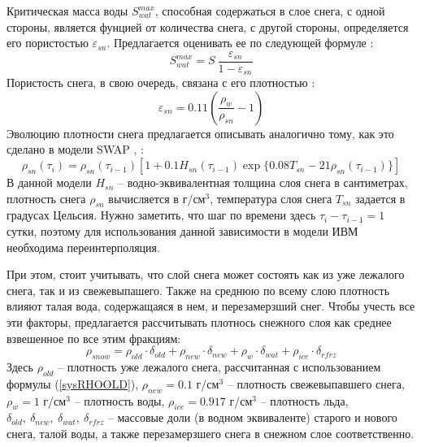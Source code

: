 \documentclass[a4paper, fontsize=14pt]{scrartcl}
\begin{document}
Критическая масса воды $S_{wat}^{max}$, способная содержаться в слое снега, с одной стороны, является фунцией от количества снега, с другой стороны, определяется его пористостью $\varepsilon_{sn}$. Предлагается оценивать ее по следующей формуле \cite{Gusev2002}:
\begin{equation}
     S_{wat}^{max} = S ~\dfrac{\varepsilon_{sn}}{1 - \varepsilon_{sn}}  \label{sys}  
\end{equation}
Пористость снега, в свою очередь, связана с его плотностью \cite{Stock}:
\begin{equation}
    \varepsilon_{sn} = 0.11 \left( \dfrac{\rho_w}{\rho_{sn}} - 1 \right)  \label{sys}  
\end{equation}
Эволюцию плотности снега предлагается описывать аналогично тому, как это сделано в модели SWAP \cite{Gusev2002}, \cite{YOSIDA1955}:
\begin{equation}
    \rho_{sn}(\tau_i) = \rho_{sn}(\tau_{i-1}) \left[  1 + 0.1 H_{sn}(\tau_{i-1}) \exp \{ 0.08 T_{sn} - 21 \rho_{sn}(\tau_{i-1})  \} \right]    \label{sysRHOOLD}  
\end{equation}
В данной модели $H_{sn}$ -- водно-эквивалентная толщина слоя снега в сантиметрах, плотность снега $\rho_{sn}$ вычисляется в г/см$^3$, температура слоя снега $T_{sn}$ задается в градусах Цельсия. Нужно заметить, что шаг по времени здесь $\tau_{i} - \tau_{i-1} = 1$ сутки, поэтому для использования данной зависимости в модели ИВМ необходима переинтерполяция.

При этом, стоит учитывать, что слой снега может состоять как из уже лежалого снега, так и из свежевыпашего. Также на среднюю по всему слою плотность влияют талая вода, содержащаяся в нем, и перезамерзший снег. Чтобы учесть все эти факторы, предлагается рассчитывать плотнось снежного слоя как среднее взвешенное по все этим фракциям:
\begin{equation}
    \rho_{snow} = \rho_{old} \cdot \delta_{old} + \rho_{new} \cdot \delta_{new} + \rho_{w} \cdot \delta_{wat} + \rho_{ice} \cdot \delta_{rfrz}
\end{equation}
Здесь $\rho_{old}$ -- плотность уже лежалого снега, рассчитанная с использованием формулы (\ref{sysRHOOLD}),  $\rho_{new} = 0.1$ г/см$^3$ -- плотность свежевыпавшего снега, $\rho_{w} = 1$ г/см$^3$ -- плотность воды, $\rho_{ice} = 0.917$ г/см$^3$ -- плотность льда, $\delta_{old}, ~\delta_{new}, ~\delta_{wat}, ~\delta_{rfrz}$ -- массовые доли (в водном эквиваленте) старого и нового снега, талой воды, а также перезамерзшего снега в снежном слое соответственно.
\end{document}
